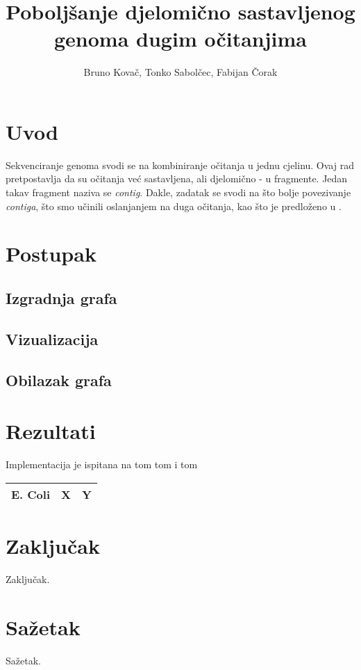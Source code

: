 \documentclass[times, utf8, seminar, numeric]{fer}
\begin{document}
\nocite{*}

\title{Poboljšanje djelomično sastavljenog genoma dugim očitanjima}

\author{Bruno Kovač, Tonko Sabolčec, Fabijan Čorak}


\maketitle

\tableofcontents

\chapter{Uvod}
Sekvenciranje genoma svodi se na kombiniranje očitanja u jednu cjelinu. Ovaj rad pretpostavlja da su očitanja već sastavljena, ali djelomično - u fragmente. Jedan takav fragment naziva se \textit{contig}. Dakle, zadatak se svodi na što bolje povezivanje \textit{contiga}, što smo učinili oslanjanjem na duga očitanja, kao što je predloženo u \cite{Du345983}.

\chapter{Postupak}
\section{Izgradnja grafa}
\section{Vizualizacija}
\section{Obilazak grafa}

\chapter{Rezultati}
Implementacija je ispitana na tom tom i tom

\begin{center}
\begin{tabular}{|c|c|c|}
	\hline
	E. Coli & X & Y \\
	
	\hline
\end{tabular}
\end{center}
\chapter{Zaključak}
Zaključak.




\chapter{Sažetak}
Sažetak.
\end{document}
